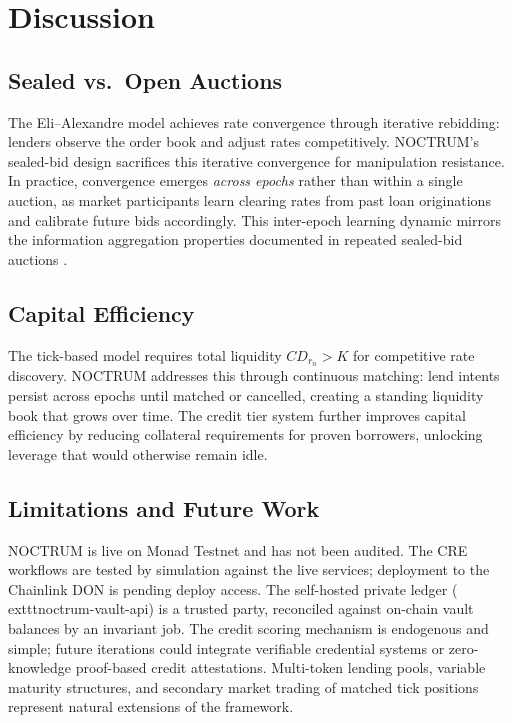 \documentclass[a4paper,11pt]{article}
\begin{document}
\section{Discussion}

\subsection{Sealed vs.\ Open Auctions}

The Eli--Alexandre model achieves rate convergence through iterative
rebidding: lenders observe the order book and adjust rates competitively.
NOCTRUM's sealed-bid design sacrifices this iterative convergence for
manipulation resistance. In practice, convergence emerges
\textit{across epochs} rather than within a single auction, as market
participants learn clearing rates from past loan originations and calibrate
future bids accordingly. This inter-epoch learning dynamic mirrors the
information aggregation properties documented in repeated sealed-bid
auctions \cite{milgrom1982}.

\subsection{Capital Efficiency}

The tick-based model requires total liquidity $CD_{r_n} > K$ for
competitive rate discovery. NOCTRUM addresses this through continuous
matching: lend intents persist across epochs until matched or cancelled,
creating a standing liquidity book that grows over time. The credit tier
system further improves capital efficiency by reducing collateral
requirements for proven borrowers, unlocking leverage that would otherwise
remain idle.

\subsection{Limitations and Future Work}

NOCTRUM is live on Monad Testnet and has not been audited. The CRE
workflows are tested by simulation against the live services; deployment to
the Chainlink DON is pending deploy access. The self-hosted private ledger
(	exttt{noctrum-vault-api}) is a trusted party, reconciled against on-chain
vault balances by an invariant job. The credit scoring mechanism is endogenous and simple; future
iterations could integrate verifiable credential systems or zero-knowledge
proof-based credit attestations. Multi-token lending pools, variable
maturity structures, and secondary market trading of matched tick positions
represent natural extensions of the framework.
\end{document}

